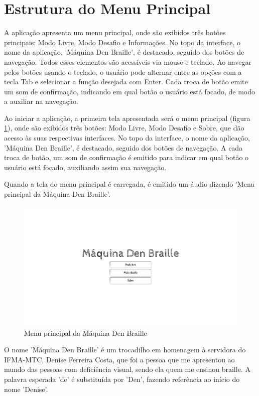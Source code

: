 \section{Estrutura do Menu Principal}

A aplicação apresenta um menu principal, onde são exibidos três botões principais: Modo Livre, Modo Desafio e Informações. No topo da interface, o nome da aplicação, 'Máquina Den Braille', é destacado, seguido dos botões de navegação. Todos esses elementos são acessíveis via mouse e teclado. Ao navegar pelos botões usando o teclado, o usuário pode alternar entre as opções com a tecla Tab e selecionar a função desejada com Enter. Cada troca de botão emite um som de confirmação, indicando em qual botão o usuário está focado, de modo a auxiliar na navegação.

Ao iniciar a aplicação, a primeira tela apresentada será o menu principal (figura \ref{fig:ch06-Menu principal}), onde são exibidos três botões: Modo Livre, Modo Desafio e Sobre, que dão acesso às suas respectivas interfaces. No topo da interface, o nome da aplicação, 'Máquina Den Braille', é destacado, seguido dos botões de navegação. A cada troca de botão, um som de confirmação é emitido para indicar em qual botão o usuário está focado, auxiliando assim sua navegação.

Quando a tela do menu principal é carregada, é emitido um áudio dizendo 'Menu principal da Máquina Den Braille'.

\begin{figure}[h]
    \centering
    \includegraphics[scale=0.3]{ch06/assets/menu-principal.png}
    \decoRule
    \caption[Menu principal]{Menu principal da Máquina Den Braille}
    \label{fig:ch06-Menu principal}
\end{figure}

O nome 'Máquina Den Braille' é um trocadilho em homenagem à servidora do \gls{IFMA-MTC}, Denise Ferreira Costa, que foi a pessoa que me apresentou ao mundo das pessoas com deficiência visual, sendo ela quem me ensinou braille. A palavra esperada 'de' é substituída por 'Den', fazendo referência ao início do nome 'Denise'.

